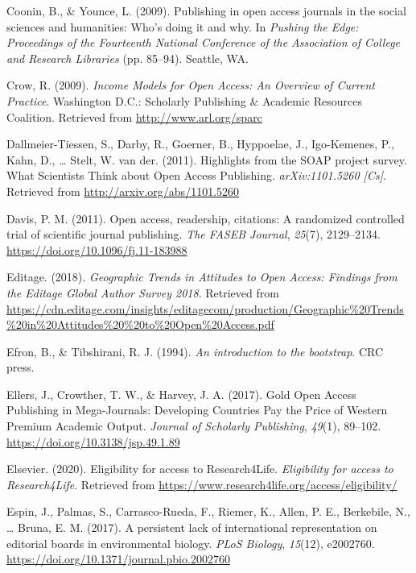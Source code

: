 \documentclass[english,man]{apa6}
\begin{document}
\leavevmode\hypertarget{ref-coonin_publishing_2009}{}%
Coonin, B., \& Younce, L. (2009). Publishing in open access journals in the social sciences and humanities: Who's doing it and why. In \emph{Pushing the Edge: Proceedings of the Fourteenth National Conference of the Association of College and Research Libraries} (pp. 85--94). Seattle, WA.

\leavevmode\hypertarget{ref-crow_income_2009}{}%
Crow, R. (2009). \emph{Income Models for Open Access: An Overview of Current Practice}. Washington D.C.: Scholarly Publishing \& Academic Resources Coalition. Retrieved from \url{http://www.arl.org/sparc}

\leavevmode\hypertarget{ref-dallmeier-tiessen_highlights_2011}{}%
Dallmeier-Tiessen, S., Darby, R., Goerner, B., Hyppoelae, J., Igo-Kemenes, P., Kahn, D., \ldots{} Stelt, W. van der. (2011). Highlights from the SOAP project survey. What Scientists Think about Open Access Publishing. \emph{arXiv:1101.5260 {[}Cs{]}}. Retrieved from \url{http://arxiv.org/abs/1101.5260}

\leavevmode\hypertarget{ref-davis_open_2011}{}%
Davis, P. M. (2011). Open access, readership, citations: A randomized controlled trial of scientific journal publishing. \emph{The FASEB Journal}, \emph{25}(7), 2129--2134. \url{https://doi.org/10.1096/fj.11-183988}

\leavevmode\hypertarget{ref-editage_geographic_2018}{}%
Editage. (2018). \emph{Geographic Trends in Attitudes to Open Access: Findings from the Editage Global Author Survey 2018}. Retrieved from \url{https://cdn.editage.com/insights/editagecom/production/Geographic\%20Trends\%20in\%20Attitudes\%20\%20to\%20Open\%20Access.pdf}

\leavevmode\hypertarget{ref-efron_introduction_1994}{}%
Efron, B., \& Tibshirani, R. J. (1994). \emph{An introduction to the bootstrap}. CRC press.

\leavevmode\hypertarget{ref-ellers_gold_2017}{}%
Ellers, J., Crowther, T. W., \& Harvey, J. A. (2017). Gold Open Access Publishing in Mega-Journals: Developing Countries Pay the Price of Western Premium Academic Output. \emph{Journal of Scholarly Publishing}, \emph{49}(1), 89--102. \url{https://doi.org/10.3138/jsp.49.1.89}

\leavevmode\hypertarget{ref-elsevier_eligibility_2020}{}%
Elsevier. (2020). Eligibility for access to Research4Life. \emph{Eligibility for access to Research4Life}. Retrieved from \url{https://www.research4life.org/access/eligibility/}

\leavevmode\hypertarget{ref-espin_persistent_2017}{}%
Espin, J., Palmas, S., Carrasco-Rueda, F., Riemer, K., Allen, P. E., Berkebile, N., \ldots{} Bruna, E. M. (2017). A persistent lack of international representation on editorial boards in environmental biology. \emph{PLoS Biology}, \emph{15}(12), e2002760. \url{https://doi.org/10.1371/journal.pbio.2002760}
\end{document}
